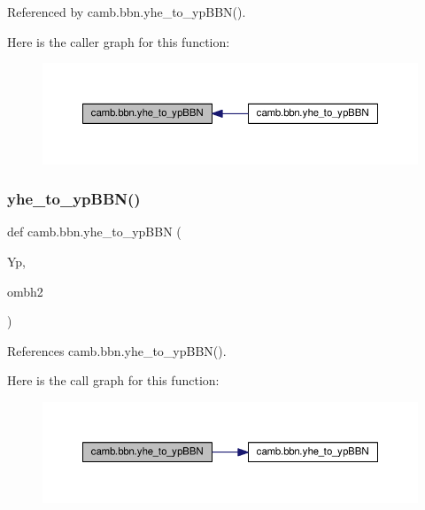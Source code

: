 Referenced by camb.\+bbn.\+yhe\+\_\+to\+\_\+yp\+B\+B\+N().

Here is the caller graph for this function\+:
\nopagebreak
\begin{figure}[H]
\begin{center}
\leavevmode
\includegraphics[width=350pt]{namespacecamb_1_1bbn_a114f83bb5e17fd586485de562d04035e_icgraph}
\end{center}
\end{figure}
\mbox{\label{namespacecamb_1_1bbn_a0fba7f6a46bfb06711a39350bcfe238f}} 
\subsubsection{\texorpdfstring{yhe\+\_\+to\+\_\+yp\+B\+B\+N()}{yhe\_to\_ypBBN()}\hspace{0.1cm}{\footnotesize\ttfamily [2/2]}}
{\footnotesize\ttfamily def camb.\+bbn.\+yhe\+\_\+to\+\_\+yp\+B\+BN (\begin{DoxyParamCaption}\item[{}]{Yp,  }\item[{}]{ombh2 }\end{DoxyParamCaption})}



References camb.\+bbn.\+yhe\+\_\+to\+\_\+yp\+B\+B\+N().

Here is the call graph for this function\+:
\nopagebreak
\begin{figure}[H]
\begin{center}
\leavevmode
\includegraphics[width=350pt]{namespacecamb_1_1bbn_a0fba7f6a46bfb06711a39350bcfe238f_cgraph}
\end{center}
\end{figure}
\mbox{\label{namespacecamb_1_1bbn_ad29937c86c274eada16f48fc3c2e3727}} 
